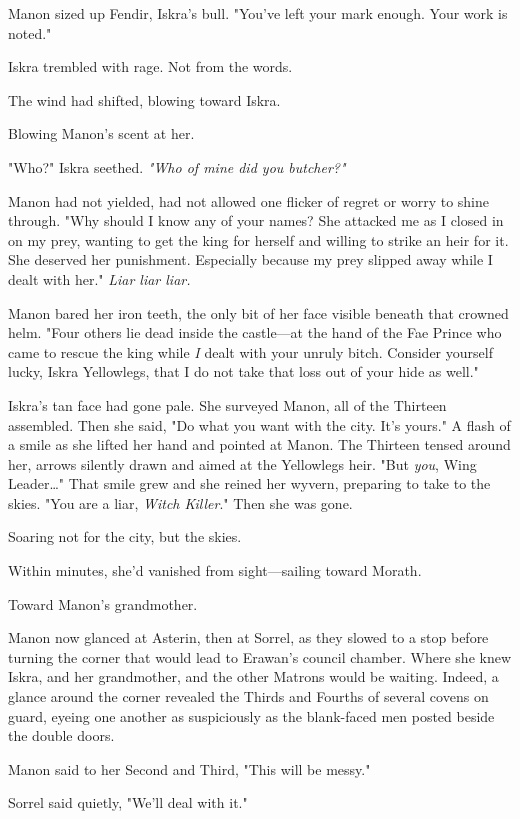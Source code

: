 Manon sized up Fendir, Iskra's bull. "You've left your mark enough. Your work is noted."

Iskra trembled with rage. Not from the words.

The wind had shifted, blowing toward Iskra.

Blowing Manon's scent at her.

"Who?" Iskra seethed. \emph{"Who of mine did you butcher?"}

Manon had not yielded, had not allowed one flicker of regret or worry to shine through. "Why should I know any of your names? She attacked me as I closed in on my prey, wanting to get the king for herself and willing to strike an heir for it. She deserved her punishment. Especially because my prey slipped away while I dealt with her." \emph{Liar liar liar.}

Manon bared her iron teeth, the only bit of her face visible beneath that crowned helm. "Four others lie dead inside the castle---at the hand of the Fae Prince who came to rescue the king while \emph{I} dealt with your unruly bitch. Consider yourself lucky, Iskra Yellowlegs, that I do not take that loss out of your hide as well."

Iskra's tan face had gone pale. She surveyed Manon, all of the Thirteen assembled. Then she said, "Do what you want with the city. It's yours." A flash of a smile as she lifted her hand and pointed at Manon. The Thirteen tensed around her, arrows silently drawn and aimed at the Yellowlegs heir. "But \emph{you}, Wing Leader\ldots" That smile grew and she reined her wyvern, preparing to take to the skies. "You are a liar, \emph{Witch Killer}." Then she was gone.

Soaring not for the city, but the skies.

Within minutes, she'd vanished from sight---sailing toward Morath.

Toward Manon's grandmother.

Manon now glanced at Asterin, then at Sorrel, as they slowed to a stop before turning the corner that would lead to Erawan's council chamber. Where she knew Iskra, and her grandmother, and the other Matrons would be waiting. Indeed, a glance around the corner revealed the Thirds and Fourths of several covens on guard, eyeing one another as suspiciously as the blank-faced men posted beside the double doors.

Manon said to her Second and Third, "This will be messy."

Sorrel said quietly, "We'll deal with it."

